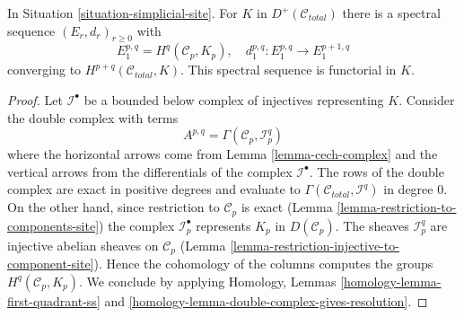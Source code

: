 \begin{lemma}
\label{lemma-simplicial-sheaf-cohomology-site}
In Situation \ref{situation-simplicial-site}. For $K$ in
$D^+(\mathcal{C}_{total})$ there is a spectral sequence
$(E_r, d_r)_{r \geq 0}$ with
$$
E_1^{p, q} = H^q(\mathcal{C}_p, K_p),\quad
d_1^{p, q} : E_1^{p, q} \to E_1^{p + 1, q}
$$
converging to $H^{p + q}(\mathcal{C}_{total}, K)$.
This spectral sequence is functorial in $K$.
\end{lemma}

\begin{proof}
Let $\mathcal{I}^\bullet$ be a bounded below complex of injectives
representing $K$. Consider the double complex with terms
$$
A^{p, q} = \Gamma(\mathcal{C}_p, \mathcal{I}^q_p)
$$
where the horizontal arrows come from Lemma \ref{lemma-cech-complex}
and the vertical arrows from the differentials of the
complex $\mathcal{I}^\bullet$. The rows of the double complex are exact
in positive degrees and evaluate to
$\Gamma(\mathcal{C}_{total}, \mathcal{I}^q)$ in degree $0$.
On the other hand, since restriction to $\mathcal{C}_p$ is exact
(Lemma \ref{lemma-restriction-to-components-site})
the complex $\mathcal{I}_p^\bullet$ represents $K_p$ in
$D(\mathcal{C}_p)$. The sheaves $\mathcal{I}_p^q$ are injective
abelian sheaves on $\mathcal{C}_p$
(Lemma \ref{lemma-restriction-injective-to-component-site}).
Hence the cohomology of the columns computes the groups
$H^q(\mathcal{C}_p, K_p)$. We conclude by applying
Homology, Lemmas \ref{homology-lemma-first-quadrant-ss} and
\ref{homology-lemma-double-complex-gives-resolution}.
\end{proof}

